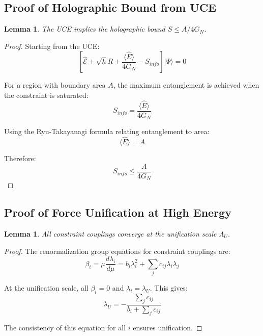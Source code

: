 \documentclass[12pt,a4paper]{article}
\newtheorem{lemma}[theorem]{Lemma}
\begin{document}
\subsection{Proof of Holographic Bound from UCE}

\begin{lemma}
The UCE implies the holographic bound $S \leq A/4G_N$.
\end{lemma}

\begin{proof}
Starting from the UCE:
\begin{equation}
\left[ \hat{\mathcal{E}} + \sqrt{h}R + \frac{\langle \hat{E} \rangle}{4G_N} - S_{info} \right] |\Psi\rangle = 0
\end{equation}

For a region with boundary area $A$, the maximum entanglement is achieved when the constraint is saturated:
\begin{equation}
S_{info} = \frac{\langle \hat{E} \rangle}{4G_N}
\end{equation}

Using the Ryu-Takayanagi formula relating entanglement to area:
\begin{equation}
\langle \hat{E} \rangle = A
\end{equation}

Therefore:
\begin{equation}
S_{info} \leq \frac{A}{4G_N}
\end{equation}
\end{proof}

\subsection{Proof of Force Unification at High Energy}

\begin{lemma}
All constraint couplings converge at the unification scale $\Lambda_U$.
\end{lemma}

\begin{proof}
The renormalization group equations for constraint couplings are:
\begin{equation}
\beta_i = \mu \frac{d\lambda_i}{d\mu} = b_i \lambda_i^2 + \sum_j c_{ij} \lambda_i \lambda_j
\end{equation}

At the unification scale, all $\beta_i = 0$ and $\lambda_i = \lambda_U$. This gives:
\begin{equation}
\lambda_U = -\frac{\sum_j c_{ij}}{b_i + \sum_j c_{ij}}
\end{equation}

The consistency of this equation for all $i$ ensures unification.
\end{proof}
\end{document}
